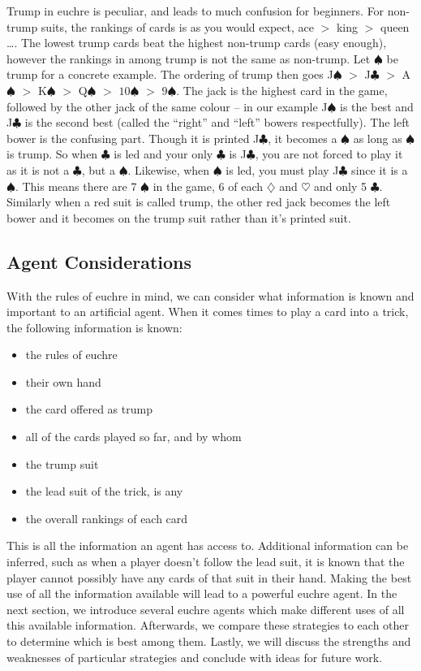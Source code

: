 Trump in euchre is peculiar, and leads to much confusion for beginners. For non-trump suits, the rankings of cards is as you would expect, ace $>$
king $>$ queen \ldots. The lowest trump cards beat the highest non-trump cards (easy enough), however the rankings in among trump is not the same as
non-trump. Let $\spadesuit$ be trump for a concrete example. The ordering of trump then goes
J$\spadesuit$ $>$ J$\clubsuit$ $>$ A$\spadesuit$ $>$ K$\spadesuit$ $>$ Q$\spadesuit$ $>$ $10\spadesuit$ $>$ $9\spadesuit$.
The jack is the highest card in the game, followed by the other jack of the same colour -- in our example J$\spadesuit$ is the best and J$\clubsuit$
is the second best (called the ``right'' and ``left'' bowers respectfully). The left bower is the confusing part. Though it is printed J$\clubsuit$, it
becomes a $\spadesuit$ as long as $\spadesuit$ is trump. So when $\clubsuit$ is led and your only $\clubsuit$ is J$\clubsuit$, you are not forced
to play it as it is not a $\clubsuit$, but a $\spadesuit$. Likewise, when $\spadesuit$ is led, you must play J$\clubsuit$ since it is a $\spadesuit$.
This means there are 7 $\spadesuit$ in the game, 6 of each $\diamondsuit$ and $\heartsuit$ and only 5 $\clubsuit$.
Similarly when a red suit is called trump, the other red jack becomes the left bower and it becomes on the trump suit rather than it's printed suit.


\subsection{Agent Considerations}

With the rules of euchre in mind, we can consider what information is known and important to an artificial agent. When it comes times to play a card
into a trick, the following information is known:
\begin{itemize}[noitemsep, label={}]
    \item the rules of euchre
    \item their own hand
    \item the card offered as trump
    \item all of the cards played so far, and by whom
    \item the trump suit
    \item the lead suit of the trick, is any
    \item the overall rankings of each card
\end{itemize}

This is all the information an agent has access to. Additional information can be inferred, such as when a player doesn't follow the lead suit,
it is known that the player cannot possibly have any cards of that suit in their hand. Making the best use of all the information available
will lead to a powerful euchre agent. In the next section, we introduce several euchre agents which make different uses of all this available
information. Afterwards, we compare these strategies to each other to determine which is best among them. Lastly, we will discuss the
strengths and weaknesses of particular strategies and conclude with ideas for future work.
